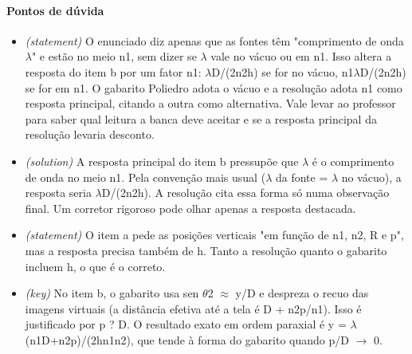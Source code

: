 \documentclass{article}%
\begin{document}
\paragraph{Pontos de dúvida}%
\begin{itemize}%
\item%
\textit{(statement)} O enunciado diz apenas que as fontes têm "comprimento de onda $\lambda$" e estão no meio n1, sem dizer se $\lambda$ vale no vácuo ou em n1. Isso altera a resposta do item b por um fator n1: $\lambda$D/(2n2h) se for no vácuo, n1$\lambda$D/(2n2h) se for em n1. O gabarito Poliedro adota o vácuo e a resolução adota n1 como resposta principal, citando a outra como alternativa. Vale levar ao professor para saber qual leitura a banca deve aceitar e se a resposta principal da resolução levaria desconto.%
\item%
\textit{(solution)} A resposta principal do item b pressupõe que $\lambda$ é o comprimento de onda no meio n1. Pela convenção mais usual ($\lambda$ da fonte = $\lambda$ no vácuo), a resposta seria $\lambda$D/(2n2h). A resolução cita essa forma só numa observação final. Um corretor rigoroso pode olhar apenas a resposta destacada.%
\item%
\textit{(statement)} O item a pede as posições verticais "em função de n1, n2, R e p", mas a resposta precisa também de h. Tanto a resolução quanto o gabarito incluem h, o que é o correto.%
\item%
\textit{(key)} No item b, o gabarito usa sen $\theta$2 $\approx$ y/D e despreza o recuo das imagens virtuais (a distância efetiva até a tela é D + n2p/n1). Isso é justificado por p ? D. O resultado exato em ordem paraxial é y = $\lambda$(n1D+n2p)/(2hn1n2), que tende à forma do gabarito quando p/D $\to$ 0.%
\end{itemize}%
\end{document}
